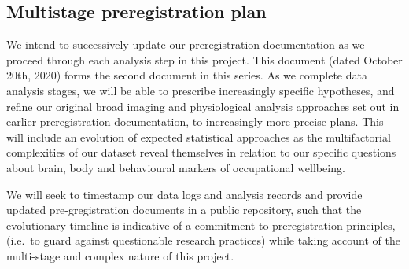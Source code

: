 \documentclass[
  english,
  man, donotrepeattitle,floatsintext]{apa6}
\begin{document}
\newpage

\hypertarget{multistage-preregistration-plan}{%
\subsection{Multistage preregistration plan}\label{multistage-preregistration-plan}}

We intend to successively update our preregistration documentation as we proceed through each analysis step in this project. This document (dated October 20th, 2020) forms the second document in this series. As we complete data analysis stages, we will be able to prescribe increasingly specific hypotheses, and refine our original broad imaging and physiological analysis approaches set out in earlier preregistration documentation, to increasingly more precise plans. This will include an evolution of expected statistical approaches as the multifactorial complexities of our dataset reveal themselves in relation to our specific questions about brain, body and behavioural markers of occupational wellbeing.

We will seek to timestamp our data logs and analysis records and provide updated pre-gregistration documents in a public repository, such that the evolutionary timeline is indicative of a commitment to preregistration principles, (i.e.~to guard against questionable research practices) while taking account of the multi-stage and complex nature of this project.

\newpage

\newpage

\hspace{1cm}
\end{document}
